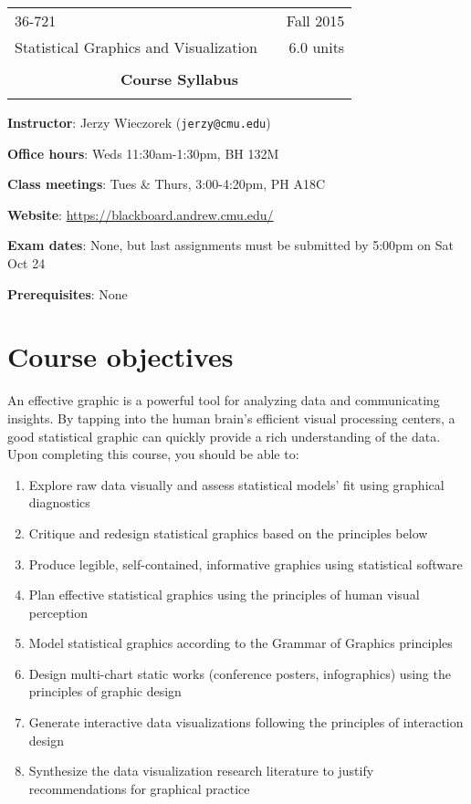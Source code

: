 \documentclass[12pt]{article}
\begin{document}
\begin{table}\centering
\begin{tabular*}{6.5in}{@{\extracolsep{\fill}}|llr|} \hline
36-721 & \hspace*{0.5 in} & Fall 2015 \\
Statistical Graphics and Visualization & & 6.0 units \\
 & & \\
\multicolumn{3}{|c|}{
{{\large {\bf Course Syllabus}}}} \\
 & & \\ \hline
\end{tabular*}
\end{table}

\textbf{Instructor}: Jerzy Wieczorek (\texttt{jerzy@cmu.edu})

\textbf{Office hours}: Weds 11:30am-1:30pm, BH 132M

\textbf{Class meetings}: Tues \& Thurs, 3:00-4:20pm, PH A18C

\textbf{Website}: \url{https://blackboard.andrew.cmu.edu/}

\textbf{Exam dates}: None, but last assignments must be submitted by 5:00pm on Sat Oct 24

\textbf{Prerequisites}: None

\section*{Course objectives}
An effective graphic is a powerful tool for analyzing data and communicating insights. By tapping into the human brain's efficient visual processing centers, a good statistical graphic can quickly provide a rich understanding of the data.
Upon completing this course, you should be able to:
\begin{enumerate}
	\item Explore raw data visually and assess statistical models' fit using graphical diagnostics
	\item Critique and redesign statistical graphics based on the principles below
	\item Produce legible, self-contained, informative graphics using statistical software
	\item Plan effective statistical graphics using the principles of human visual perception
	\item Model statistical graphics according to the Grammar of Graphics principles
	\item Design multi-chart static works (conference posters, infographics) using the principles of graphic design
	\item Generate interactive data visualizations following the principles of interaction design
	\item Synthesize the data visualization research literature to justify recommendations for graphical practice
\end{enumerate}
\end{document}
